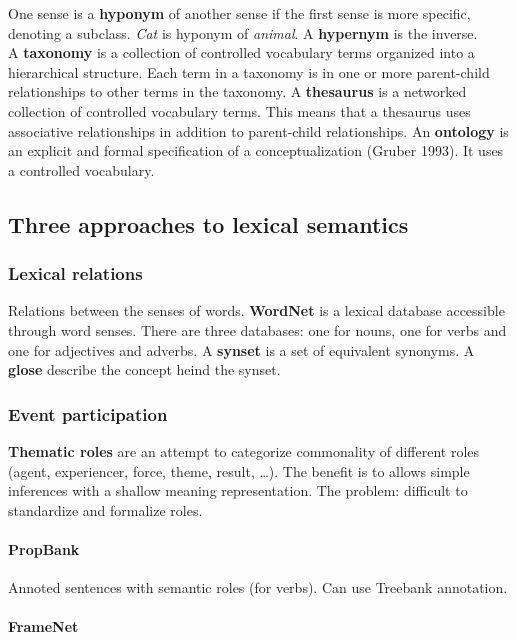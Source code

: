 One sense is a \textbf{hyponym} of another sense if the first sense is more specific, denoting a subclass. \textit{Cat} is hyponym of \textit{animal}. A \textbf{hypernym} is the inverse. \\

A \textbf{taxonomy} is a collection of controlled vocabulary terms organized into a hierarchical structure. Each term in a taxonomy is in one or more parent-child relationships to other terms in the taxonomy. A \textbf{thesaurus} is a networked collection of controlled vocabulary terms. This means that a thesaurus uses associative relationships in addition to parent-child relationships. An \textbf{ontology} is an explicit and formal specification of a conceptualization (Gruber 1993). It uses a controlled vocabulary.

\subsection{Three approaches to lexical semantics}

\subsubsection{Lexical relations}

Relations between the senses of words. \textbf{WordNet} is a lexical database accessible through word senses. There are three databases: one for nouns, one for verbs and one for adjectives and adverbs. A \textbf{synset} is a set of equivalent synonyms. A \textbf{glose} describe the concept heind the synset.

\subsubsection{Event participation}

\textbf{Thematic roles} are an attempt to categorize commonality of different roles (agent, experiencer, force, theme, result, \dots). The benefit is to allows simple inferences with a shallow meaning representation. The problem: difficult to standardize and formalize roles.

\paragraph{PropBank}

Annoted sentences with semantic roles (for verbs). Can use Treebank annotation.

\paragraph{FrameNet}

